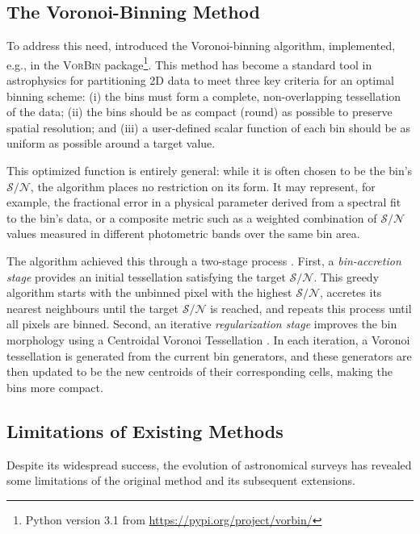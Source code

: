 \documentclass[fleqn,usenatbib]{mnras}
\newcommand{\sn}{\mathcal{S/N}}
\begin{document}
\subsection{The Voronoi-Binning Method}

To address this need, \citet{Cappellari2003} introduced the Voronoi-binning algorithm, implemented, e.g., in the \textsc{VorBin} package\footnote{Python version 3.1 from \url{https://pypi.org/project/vorbin/}}. This method has become a standard tool in astrophysics for partitioning 2D data to meet three key criteria for an optimal binning scheme:  
(i) the bins must form a complete, non-overlapping tessellation of the data;  
(ii) the bins should be as compact (round) as possible to preserve spatial resolution; and  
(iii) a user-defined scalar function of each bin should be as uniform as possible around a target value.  

This optimized function is entirely general: while it is often chosen to be the bin’s $\sn$, the algorithm places no restriction on its form. It may represent, for example, the fractional error in a physical parameter derived from a spectral fit to the bin’s data, or a composite metric such as a weighted combination of $\sn$ values measured in different photometric bands over the same bin area.  

The algorithm achieved this through a two-stage process \citep{Cappellari2003}. First, a \textit{bin-accretion stage} provides an initial tessellation satisfying the target $\sn$. This greedy algorithm starts with the unbinned pixel with the highest $\sn$, accretes its nearest neighbours until the target $\sn$ is reached, and repeats this process until all pixels are binned. Second, an iterative \textit{regularization stage} improves the bin morphology using a Centroidal Voronoi Tessellation \citep[CVT,][]{Du1999}. In each iteration, a Voronoi tessellation is generated from the current bin generators, and these generators are then updated to be the new centroids of their corresponding cells, making the bins more compact.

\subsection{Limitations of Existing Methods}

Despite its widespread success, the evolution of astronomical surveys has revealed some limitations of the original method and its subsequent extensions.
 
\end{document}
